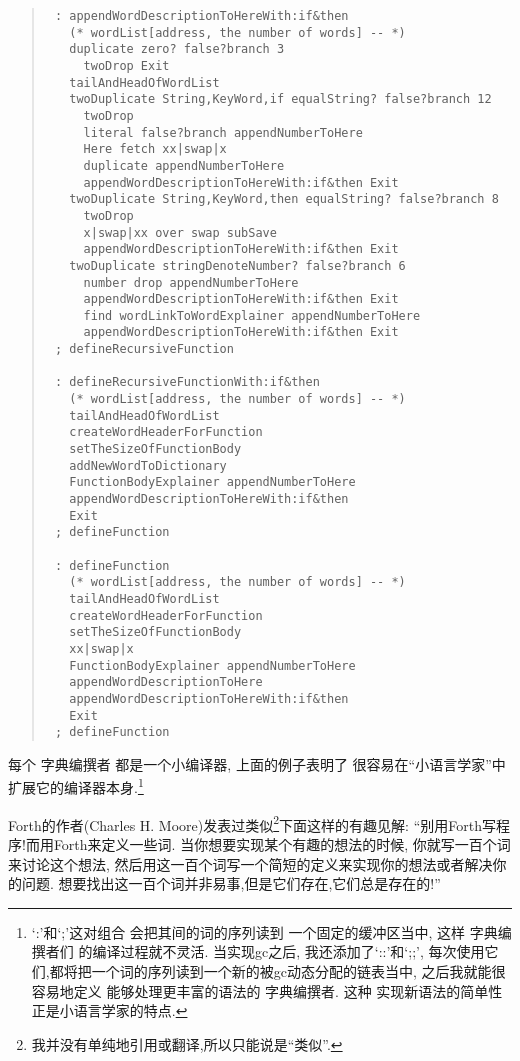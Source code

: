 \documentclass[a4paper]{article}
\begin{document}
\begin{quote}
\begin{verbatim}
 : appendWordDescriptionToHereWith:if&then
   (* wordList[address, the number of words] -- *)
   duplicate zero? false?branch 3
     twoDrop Exit
   tailAndHeadOfWordList
   twoDuplicate String,KeyWord,if equalString? false?branch 12
     twoDrop
     literal false?branch appendNumberToHere
     Here fetch xx|swap|x
     duplicate appendNumberToHere
     appendWordDescriptionToHereWith:if&then Exit
   twoDuplicate String,KeyWord,then equalString? false?branch 8
     twoDrop
     x|swap|xx over swap subSave
     appendWordDescriptionToHereWith:if&then Exit
   twoDuplicate stringDenoteNumber? false?branch 6
     number drop appendNumberToHere
     appendWordDescriptionToHereWith:if&then Exit
     find wordLinkToWordExplainer appendNumberToHere
     appendWordDescriptionToHereWith:if&then Exit
 ; defineRecursiveFunction

 : defineRecursiveFunctionWith:if&then
   (* wordList[address, the number of words] -- *)
   tailAndHeadOfWordList
   createWordHeaderForFunction
   setTheSizeOfFunctionBody
   addNewWordToDictionary
   FunctionBodyExplainer appendNumberToHere
   appendWordDescriptionToHereWith:if&then
   Exit
 ; defineFunction

 : defineFunction
   (* wordList[address, the number of words] -- *)
   tailAndHeadOfWordList
   createWordHeaderForFunction
   setTheSizeOfFunctionBody
   xx|swap|x
   FunctionBodyExplainer appendNumberToHere
   appendWordDescriptionToHere
   appendWordDescriptionToHereWith:if&then
   Exit
 ; defineFunction
\end{verbatim}
\end{quote}

每个 字典编撰者 都是一个小编译器,
上面的例子表明了 很容易在``小语言学家''中扩展它的编译器本身.\footnote{`:'和`;'这对组合 会把其间的词的序列读到 一个固定的缓冲区当中,
这样 字典编撰者们 的编译过程就不灵活.
当实现gc之后,
我还添加了`::'和`;;',
每次使用它们,都将把一个词的序列读到一个新的被gc动态分配的链表当中,
之后我就能很容易地定义 能够处理更丰富的语法的 字典编撰者.
这种 实现新语法的简单性 正是小语言学家的特点.}

Forth的作者(Charles H. Moore)发表过类似\footnote{我并没有单纯地引用或翻译,所以只能说是``类似''.}下面这样的有趣见解:
``别用Forth写程序!而用Forth来定义一些词.
当你想要实现某个有趣的想法的时候,
你就写一百个词来讨论这个想法,
然后用这一百个词写一个简短的定义来实现你的想法或者解决你的问题.
想要找出这一百个词并非易事,但是它们存在,它们总是存在的!''
\end{document}
